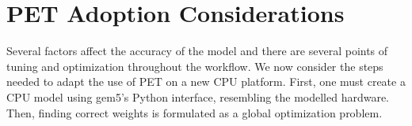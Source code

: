 \chapter{PET Adoption Considerations}

Several factors affect the accuracy of the model and there are several points of
tuning and optimization throughout the workflow. We now consider the steps
needed to adapt the use of PET on a new CPU platform. First, one must create a
CPU model using gem5's Python interface, resembling the modelled hardware. Then,
finding correct weights is formulated as a global optimization problem.







